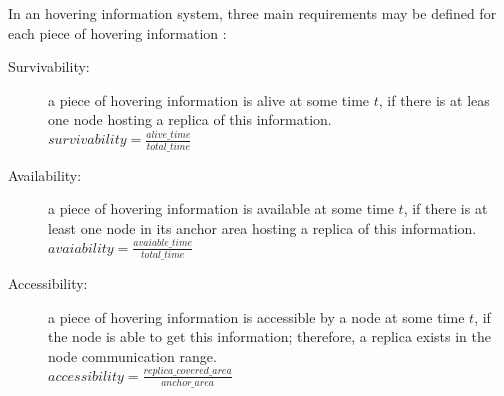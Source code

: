 In an hovering information system, three main requirements may be defined for each
piece of hovering information \cite{hover}:
\begin{description}
	\item[Survivability:] a piece of hovering information is alive at some time
		$t$, if there is at leas one node hosting a replica of this information.
		\\
		$survivability = \frac{alive\_time}{total\_time}$
	\item[Availability:] a piece of hovering information is available at some time
		$t$, if there is at least one node in its anchor area hosting a replica of
		this information.
		\\
		$avaiability = \frac{avaiable\_time}{total\_time}$
	\item[Accessibility:] a piece of hovering information is accessible by a node
		at some time $t$, if the node is able to get this information; therefore, a
		replica exists in the node communication range.
		\\
		$accessibility = \frac{replica\_covered\_area}{anchor\_area}$
\end{description}
